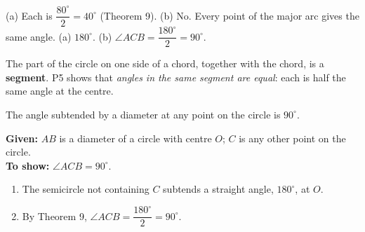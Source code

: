 \begin{answerblock}
(a) Each is $\dfrac{80^\circ}{2}=40^\circ$ (Theorem 9). (b) No. Every point of the major arc gives the same angle.
(a) $180^\circ$. (b) $\angle ACB=\dfrac{180^\circ}{2}=90^\circ$.
\end{answerblock}

The part of the circle on one side of a chord, together with the chord, is a \textbf{segment}. P5 shows that \emph{angles in the same segment are equal}: each is half the same angle at the centre.

\begin{corollary}
The angle subtended by a diameter at any point on the circle is $90^\circ$.
\end{corollary}


\why
\textbf{Given:} $AB$ is a diameter of a circle with centre $O$; $C$ is any other point on the circle.\\
\textbf{To show:} $\angle ACB=90^\circ$.
\begin{enumerate}[leftmargin=1.8em,itemsep=1pt]
  \item The semicircle not containing $C$ subtends a straight angle, $180^\circ$, at $O$.
  \item By Theorem 9, $\angle ACB=\dfrac{180^\circ}{2}=90^\circ$.
\end{enumerate}


